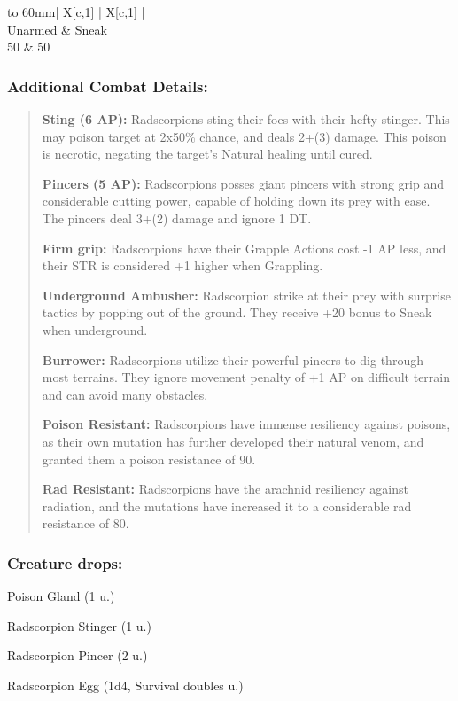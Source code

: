 \documentclass[11pt,a4paper,twocolumn]{book}
\begin{document}
	\bigskip
	{
		\begin{tabu} to 60mm{| X[c,1] | X[c,1] |}
			\hline
			 \\ \hline
			Unarmed & Sneak                          \\
			50      & 50                             \\ \hline
		\end{tabu}
		
	}
	
	\subsubsection*{Additional Combat Details:}
	\begin{verse}
		\textbf{Sting (6 AP):} Radscorpions sting their foes with their hefty stinger. This may poison target at 2x50\% chance, and deals 2+(3) damage. This poison is necrotic, negating the target's Natural healing until cured.
		
		\textbf{Pincers (5 AP):} Radscorpions posses giant pincers with strong grip and considerable cutting power, capable of holding down its prey with ease. The pincers deal 3+(2) damage and ignore 1 DT.
		
		\textbf{Firm grip:} Radscorpions have their Grapple Actions cost -1 AP less, and their STR is considered +1 higher when Grappling.
		
		\textbf{Underground Ambusher:} Radscorpion strike at their prey with surprise tactics by popping out of the ground. They receive +20 bonus to Sneak when underground.
		
		\textbf{Burrower:} Radscorpions utilize their powerful pincers to dig through most terrains. They ignore movement penalty of +1 AP on difficult terrain and can avoid many obstacles.
		
		\textbf{Poison Resistant:} Radscorpions have immense resiliency against poisons, as their own mutation has further developed their natural venom, and granted them a poison resistance of 90.
		
		\textbf{Rad Resistant:} Radscorpions have the arachnid resiliency against radiation, and the mutations have increased it to a considerable rad resistance of 80.
	\end{verse}
	
	\subsubsection*{Creature drops:}
	\begin{compactitem}
		\item Poison Gland (1 u.)
		\item Radscorpion Stinger (1 u.)
		\item Radscorpion Pincer (2 u.)
		\item Radscorpion Egg (1d4, Survival doubles u.)
	\end{compactitem}
	
\end{document}
